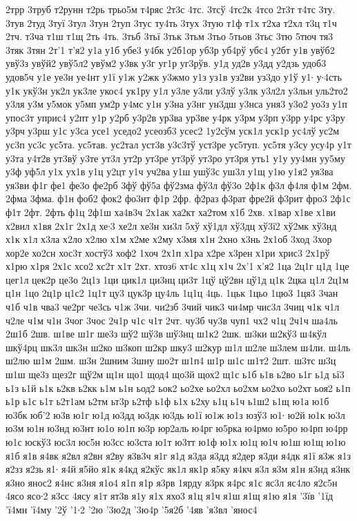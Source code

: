 {2трр
3труб
т2рунн
т2рь
трьо5м
т4ряс
2т3с
4тс.
3тсў
4тс2к
4тсо
2т3т
т4тс
3ту.
3тув
2туд
3туї
3тул
3тун
2туп
3тус
ту4ть
3тух
3тую
т1ф
т1х
т2ха
т2хл
т3ц
т1ч
2тч.
т3ча
т1ш
т1щ
2ть
4ть.
3тьб
3тьї
3тьк
3тьм
3тьо
5тьов
3тьс
3тю
5тюч
тя3
3тяк
3тян
2т'1
т'я2
у1а
у1б
убе3
у4бк
у2б1ор
уб3р
уб4рў
убс4
у2бт
у1в
увўб2
увў3з
увўй2
увў5л2
увўм2
у3вк
у3г
уг1р
уг3рўв.
у1д
уд2в
у3дд
у2дзь
удоб3
удов5ч
у1е
уе3н
уе4нт
у1ї
у1ж
у2жк
у3жмо
у1з
уз1в
уз2ви
уз3до
у1ў
у1∙
у∙4сть
у1к
укў3н
ук2л
ук3ле
укос4
ук1ру
у1л
у3ле
у3ли
у3лў
у3лк
у3л2л
у3льн
уль2то2
у3ля
у3м
у5мок
у5мп
ум2р
у4мс
у1н
у3на
у3нг
ун3дш
у3нса
уня3
у3о2
уо3з
у1п
упос3т
уприс4
у2пт
у1р
у2рб
у3р2в
ур3ва
ур3ве
у4рк
у3рм
у3рп
у3рр
у4рс
у3ру
у3рч
у3рш
у1с
у3са
усе1
уседо2
усеозб3
усес2
1у2сўм
уск1л
уск1р
ус4лў
ус2м
ус3п
ус3с
ус5та.
ус5тав.
ус2тал
уст3в
у3с3тў
уст3ре
ус5туп.
ус5тя
у3су
усу4р
у1т
у3та
у4т2в
ут3вў
у3те
ут3л
ут2р
ут3ре
ут3рў
ут3ро
ут3ря
уть1
у1у
уу4мн
уу5му
у3ф
уф5л
у1х
ух1в
у1ц
у2цт
у1ч
уч2ва
у1ш
ушў3с
уш3л
у1щ
у1ю
у1я2
уя3ва
уя3ви
ф1г
фе1
фе3о
фе2рб
3фў
фў5а
фў2зма
фў3л
фў3о
2ф1к
ф3л
ф4ля
ф1м
2фм.
2фма
3фма.
ф1н
фоб2
фок2
фо3нт
ф1р
2фр.
ф2раз
ф3рат
фре2й
ф3рит
фро3
2ф1с
ф1т
2фт.
2фть
ф1ц
2ф1ш
ха4в3ч
2х1ак
ха2кт
ха2том
х1б
2хв.
х1вар
х1ве
х1ви
х2вил
х1вя
2х1г
2х1д
хе∙3
хе2л
хе3н
хи3л
5хў
хў1дл
хў3дц
хў3ї2
хў2мк
хў3нд
х1к
х1л
х3ла
х2ло
х2лю
х1м
х2ме
х2му
х3мя
х1н
2хно
х3нь
2х1об
3ход
3хор
хор2е
хо2сн
хос3т
хостў3
хоф2
1хоч
2х1п
х1ра
х2ре
х3рен
х1ри
хрис3
2х1рў
х1рю
х1ря
2х1с
хсо2
хс2т
х1т
2хт.
хтоз6
хт4с
х1ц
х1ч
2х'1
х'я2
1ца
2ц1г
ц1д
1це
цег1л
цек2р
це3о
2ц1з
1ци
цик1л
ци3нц
ци3т
1цў
цў2вн
цў1д
ц1к
2цка
ц1л
2ц1м
ц1н
1цо
2ц1р
ц1с2
1ц1т
цу3
цук3р
цу4ль
1ц1ц
4ць.
1цьк
1цьо
1цю3
1ця3
3чан
ч1б
ч1в
чва3
че2рг
че3сь
ч1ж
3чи.
чи2зб
3чий
чик3
чи4мр
чис3л
3чиц
ч1к
ч1л
ч2ле
ч1м
ч1н
3чог
3чос
2ч1р
ч1с
ч1т
2чт.
чу3б
чу3в
чуп1
чх2
ч1ц
2ч1ч
ша4ль
2ш1б
2шв.
ш1ве
ш1г
ше3з
шў2
шў3в
шў3нц
ш1к2
2шк.
ш3ки
ш2кў3
ш4кўл
шкў4рц
шк3л
шк3н
ш2ко
ш3коп
ш2кр
шку3
ш2кур
ш1л
ш2ле
ш3лем
ш4ли.
ш4ль
ш2лю
ш1м
2шм.
ш3н
2шним
3шну
шо2т
ш1п4
ш1р
ш1с
ш1т2
2шт.
ш3тс
ш3ц
ш1ш
ще3з
щез2г
щў2м
щ1н
що1
щод4
що3й
щох2
щ1с
ь1б
ь1в
ь2во
ь1г
ь1д
ьї3
ь1з
ь1й
ь1к
ь2кв
ь2кк
ь1м
ь1н
ьод2
ьок2
ьо2хе
ьо2хл
ьо2хм
ьо2хо
ьо2хт
ьоя2
ь1п
ь1р
ь1с
ь1т
ь2т1ам
ь2тм
ьт3р
ь2тф
ь1ф
ь1х
ь2ху
ь1ц
ь1ч
ь1ш2
ь1щ
ю1а
ю1б
ю3бк
юб'2
ю3в
ю1г
ю1д
ю3дд
ю3дк
ю3дь
ю1ї
ю1ж
ю1з
юзў3
ю1∙
ю2й
ю1к
ю3л
ю3м
ю1н
ю3нд
ю3нт
ю1о
ю1п
ю3р
юр2аль
ю4рг
ю5рка
ю4рмо
ю5ро
ю4рп
ю4рр
ю1с
юскў3
юс3л
юс5н
ю3сс
ю3ста
ю1т
ю3тт
ю1ф
ю1х
ю1ц
ю1ч
ю1ш
ю1щ
ю1ю
я1б
я1в
я4вк
я2вл
я2вн
я2ву
я3в3ч
я1г
я1д
я3да
я3дд
я2дер
я3ди
я4дк
я1ї
я3ж
я1з
я2зз
я2зь
я1∙
я4й
я5йо
я1к
я4кд
я2кўс
як1л
як1р
я5ку
я4кч
я3л
я3м
я1н
я3нд
я3нк
я3но
янос2
я4нс
я3ня
я1о4
я1п
я1р
я3рв
1ярду
я3рк
я4рс
я1с
яс3л
яс4ло
я2с5н
4ясо
ясо∙2
я3сс
4ясу
я1т
ят3в
я1у
я1х
яхо3
я1ц
я1ч
я1ш
я1щ
я1ю
я1я
'3їв
'1їд
'ї4мн
'ї4му
'2ў
'1∙2
'2ю
'3ю2д
'3ю4р
'5я2б
'4яв
'я3вл
'янос4
}
